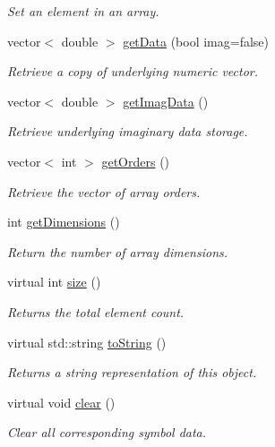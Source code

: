 \begin{DoxyCompactItemize}
\begin{DoxyCompactList}\small\item\em Set an element in an array. \end{DoxyCompactList}\item 
vector$<$ double $>$ \hyperlink{class_g_e_array_a925784223f63e75859f6db66c4a5ac9d}{get\-Data} (bool imag=false)
\begin{DoxyCompactList}\small\item\em Retrieve a copy of underlying numeric vector. \end{DoxyCompactList}\item 
vector$<$ double $>$ \hyperlink{class_g_e_array_a268b4844815433c66d860333dbca4923}{get\-Imag\-Data} ()
\begin{DoxyCompactList}\small\item\em Retrieve underlying imaginary data storage. \end{DoxyCompactList}\item 
vector$<$ int $>$ \hyperlink{class_g_e_array_a399db53fbe251d26375db2c651227c85}{get\-Orders} ()
\begin{DoxyCompactList}\small\item\em Retrieve the vector of array orders. \end{DoxyCompactList}\item 
int \hyperlink{class_g_e_array_ae9b16f0cd411b9e4d705fb49fab5efc3}{get\-Dimensions} ()
\begin{DoxyCompactList}\small\item\em Return the number of array dimensions. \end{DoxyCompactList}\item 
virtual int \hyperlink{class_g_e_array_a92572639729f917920a1c387bdf54c50}{size} ()
\begin{DoxyCompactList}\small\item\em Returns the total element count. \end{DoxyCompactList}\item 
virtual std\-::string \hyperlink{class_g_e_array_a363c7ca4a422994013edc81905a6d836}{to\-String} ()
\begin{DoxyCompactList}\small\item\em Returns a string representation of this object. \end{DoxyCompactList}\item 
virtual void \hyperlink{class_g_e_array_ad7fd6880da03d11c13387ea9e1e1cd5d}{clear} ()
\begin{DoxyCompactList}\small\item\em Clear all corresponding symbol data. \end{DoxyCompactList}\end{DoxyCompactItemize}
